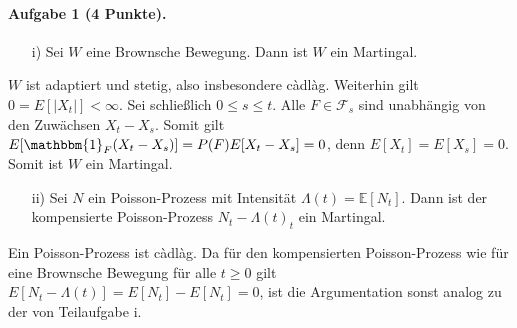 \documentclass{article}
\begin{document}
\paragraph{Aufgabe 1 \textnormal{(4 Punkte)}.}
\begin{itemize}
\item [i)] Sei $W$ eine Brownsche Bewegung.
  Dann ist $W$ ein Martingal.
\end{itemize}
$W$ ist adaptiert und stetig, also insbesondere càdlàg.
Weiterhin gilt $0=E[|X_t|]<\infty$.
Sei schließlich $0\leq s\leq t$.
Alle $F\in\mathscr{F}_s$ sind unabhängig von den Zuwächsen $X_t-X_s$.
Somit gilt $E[\mathbbm{1}_F(X_t-X_s)]=P(F)E[X_t-X_s]=0$, denn $E[X_t]=E[X_s]=0$.
Somit ist $W$ ein Martingal.
\begin{itemize}
\item [ii)] Sei $N$ ein Poisson-Prozess mit Intensität $\Lambda(t)=\mathbb{E}[N_t]$.
  Dann ist der kompensierte Poisson-Prozess $N_t-\Lambda(t)_t$ ein Martingal.
\end{itemize}
Ein Poisson-Prozess ist càdlàg.
Da für den kompensierten Poisson-Prozess wie für eine Brownsche Bewegung für alle $t\geq0$ gilt $E[N_t-\Lambda(t)]=E[N_t]-E[N_t]=0$, ist die Argumentation sonst analog zu der von Teilaufgabe i.
\pagebreak
\end{document}
